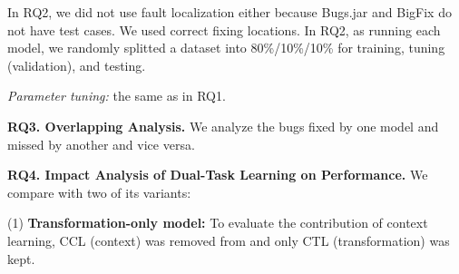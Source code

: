 



In RQ2, we did not use fault localization either because Bugs.jar and
BigFix do not have test cases. We used correct fixing locations.
In RQ2, as running each model, we randomly splitted a dataset
into 80\%/10\%/10\% for training, tuning (validation), and testing.


{\em Parameter tuning:} the same as in RQ1.



\vspace{2pt} {\bf RQ3. Overlapping Analysis.} We analyze the bugs
fixed by one model and missed by another and vice versa.


\vspace{2pt}
{\bf RQ4. Impact Analysis of Dual-Task Learning on Performance.}
We compare {\tool} with two of its variants:

(1) \textbf{Transformation-only model:} To evaluate the contribution of context learning, CCL (context)
was removed from {\tool} and only CTL (transformation) was kept.

